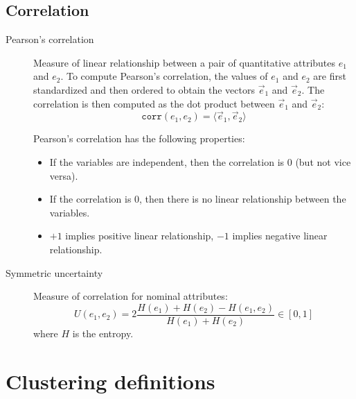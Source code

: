 \subsection{Correlation}

\begin{description}
    \item[Pearson's correlation] 
        Measure of linear relationship between a pair of quantitative attributes $e_1$ and $e_2$.
        To compute Pearson's correlation, the values of $e_1$ and $e_2$ are first standardized and then ordered to obtain the vectors $\vec{e}_1$ and $\vec{e}_2$.
        The correlation is then computed as the dot product between $\vec{e}_1$ and $\vec{e}_2$:
        \[ \texttt{corr}(e_1, e_2) = \langle \vec{e}_1, \vec{e}_2 \rangle \]

        Pearson's correlation has the following properties:
        \begin{itemize}
            \item If the variables are independent, then the correlation is 0 (but not vice versa).
            \item If the correlation is 0, then there is no linear relationship between the variables.
            \item $+1$ implies positive linear relationship, $-1$ implies negative linear relationship.
        \end{itemize}

    \item[Symmetric uncertainty] 
        Measure of correlation for nominal attributes:
        \[ U(e_1, e_2) = 2 \frac{H(e_1) + H(e_2) - H(e_1, e_2)}{H(e_1) + H(e_2)} \in [0, 1] \]
        where $H$ is the entropy.
\end{description}




\section{Clustering definitions}

